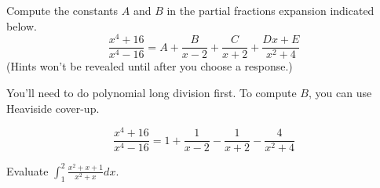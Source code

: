 \documentclass{ximera}
\begin{document}
\begin{question}%

Compute the constants \(A\) and \(B\) in the partial fractions expansion indicated below. 
\[ \frac{x^4 + 16}{x^4 - 16} =A +  \frac{B}{x-2} + \frac{C}{x+2} + \frac{Dx + E}{x^2 + 4} \]
(Hints won't be revealed until after you choose a response.)
\begin{multiplechoice}
\end{multiplechoice}
\begin{feedback}
You'll need to do polynomial long division first. To compute $B$, you can use Heaviside cover-up.
\begin{hint}
\[  \frac{x^4 + 16}{x^4 - 16} = 1 + \frac{1}{x-2} - \frac{1}{x+2} - \frac{4}{x^2+4} \]
\end{hint}
\end{feedback}


\end{question}

\begin{question}%

Evaluate \(\displaystyle \int_1^2 \frac{x^2+x+1}{x^2+x} dx\).
\begin{multiplechoice}
\end{multiplechoice}

\end{question}
\end{document}
